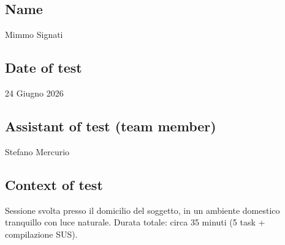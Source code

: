 ﻿\documentclass[11pt,a4paper]{article}
\begin{document}
\vspace{0.5cm}

\subsection*{Name}
\begin{tcolorbox}[base]
Mimmo Signati
\end{tcolorbox}

\subsection*{Date of test}
\begin{tcolorbox}[base]
24 Giugno 2026
\end{tcolorbox}

\subsection*{Assistant of test (team member)}
\begin{tcolorbox}[base]
Stefano Mercurio
\end{tcolorbox}

\subsection*{Context of test}
\begin{tcolorbox}[base]
Sessione svolta presso il domicilio del soggetto, in un
ambiente domestico tranquillo con luce naturale. Durata
totale: circa 35 minuti (5 task + compilazione SUS).
\end{tcolorbox}
\end{document}

